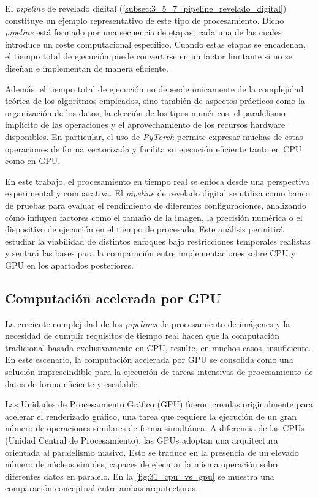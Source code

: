 El \textit{pipeline} de revelado digital (\autoref{subsec:3_5_7_pipeline_revelado_digital})
constituye un ejemplo representativo de este tipo de procesamiento. Dicho \textit{pipeline} está formado por
una secuencia de etapas, cada una de las cuales introduce un coste computacional específico.
Cuando estas etapas se encadenan, el tiempo total de ejecución puede convertirse en un factor limitante
si no se diseñan e implementan de manera eficiente.

Además, el tiempo total de ejecución no depende únicamente de la complejidad teórica de los
algoritmos empleados, sino también de aspectos prácticos como la organización de los datos, la elección
de los tipos numéricos, el paralelismo implícito de las operaciones y el aprovechamiento de los recursos
hardware disponibles. En particular, el uso de \textit{PyTorch} permite expresar
muchas de estas operaciones de forma vectorizada y facilita su ejecución eficiente tanto en CPU como en GPU.

En este trabajo, el procesamiento en tiempo real se enfoca desde una perspectiva experimental y comparativa.
El \textit{pipeline} de revelado digital se utiliza como banco de pruebas para evaluar el rendimiento de
diferentes configuraciones, analizando cómo influyen factores como el tamaño de la imagen, la precisión
numérica o el dispositivo de ejecución en el tiempo de procesado. Este análisis permitirá estudiar la
viabilidad de distintos enfoques bajo restricciones temporales realistas y sentará las bases para la
comparación entre implementaciones sobre CPU y GPU en los apartados posteriores.
\newpage

\subsection{Computación acelerada por GPU} \label{subsec:3_8_computacion_acelerada_gpu}
La creciente complejidad de los \textit{pipelines} de procesamiento de imágenes y la necesidad de cumplir 
requisitos de tiempo real hacen que la computación tradicional basada exclusivamente en CPU, resulte, en 
muchos casos, insuficiente. En este escenario, la computación acelerada por GPU se consolida
como una solución imprescindible para la ejecución de tareas intensivas de procesamiento de datos de 
forma eficiente y escalable.

Las Unidades de Procesamiento Gráfico (GPU) fueron creadas originalmente para acelerar el renderizado gráfico, 
una tarea que requiere la ejecución de un gran número de operaciones similares de forma simultánea.
A diferencia de las CPUs (Unidad Central de Procesamiento), las GPUs adoptan una arquitectura orientada al paralelismo masivo.
Esto se traduce en la presencia de un elevado número de núcleos simples, capaces de ejecutar la
misma operación sobre diferentes datos en paralelo. En la \autoref{fig:31_cpu_vs_gpu} se muestra una
comparación conceptual entre ambas arquitecturas.

